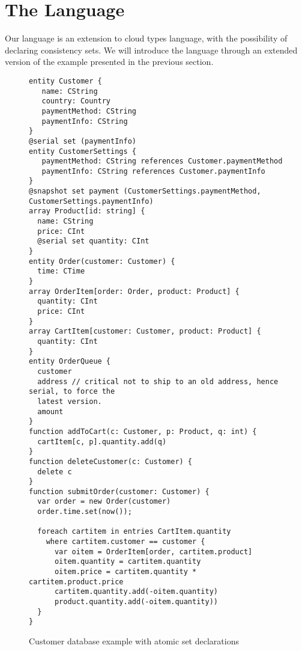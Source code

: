 

\section{The  Language} 

Our language is an extension to cloud types language, with the possibility of
declaring consistency sets. We will introduce the language through an extended
version of the example presented in the previous section. 

%
\begin{figure}[tp]
\begin{lstlisting}
entity Customer {
   name: CString 
   country: Country
   paymentMethod: CString
   paymentInfo: CString
}
@serial set (paymentInfo)
entity CustomerSettings {
   paymentMethod: CString references Customer.paymentMethod
   paymentInfo: CString references Customer.paymentInfo
}
@snapshot set payment (CustomerSettings.paymentMethod, CustomerSettings.paymentInfo)
array Product[id: string] {
  name: CString
  price: CInt
  @serial set quantity: CInt 
}
entity Order(customer: Customer) {
  time: CTime
}
array OrderItem[order: Order, product: Product] {
  quantity: CInt
  price: CInt
}
array CartItem[customer: Customer, product: Product] {
  quantity: CInt
}
entity OrderQueue {
  customer
  address // critical not to ship to an old address, hence serial, to force the
  latest version.
  amount
}
function addToCart(c: Customer, p: Product, q: int) {
  cartItem[c, p].quantity.add(q)
}
function deleteCustomer(c: Customer) {
  delete c
}
function submitOrder(customer: Customer) {
  var order = new Order(customer)
  order.time.set(now());

  foreach cartitem in entries CartItem.quantity 
    where cartitem.customer == customer {
      var oitem = OrderItem[order, cartitem.product]
      oitem.quantity = cartitem.quantity
      oitem.price = cartitem.quantity * cartitem.product.price
      cartitem.quantity.add(-oitem.quantity)
      product.quantity.add(-oitem.quantity))
  }
}
\end{lstlisting}
\caption{Customer database example with atomic set declarations}
\end{figure}
\label{lst:ctStoreSets}
\
%    

